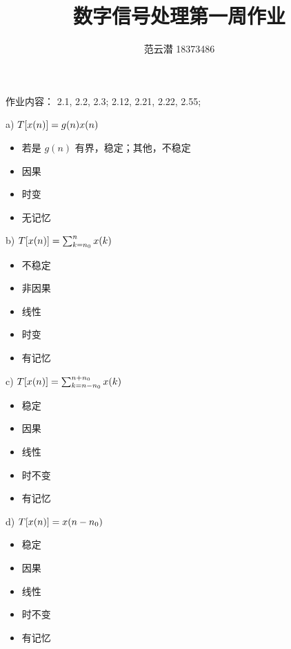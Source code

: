 \documentclass[lang=cn,11pt,a4paper,cite=authoryear]{elegantpaper}
\title{数字信号处理\quad 第一周作业}
\author{范云潜 18373486}
\institute{微电子学院 184111 班}
\date{\zhtoday}
\begin{document}
\maketitle

作业内容： 2.1, 2.2, 2.3; 2.12, 2.21, 2.22, 2.55;

\setlength{\columnseprule}{0.4pt}
\begin{multicols*}{2}



    a) \({T}[x(n)] = g(n) x(n)\) 

    \begin{itemize}
        \item 若是 \(g(n)\) 有界，稳定；其他，不稳定
        \item 因果
        \item 时变
        \item 无记忆
    \end{itemize}

    b) \({T}[x(n)] = \sum_{k=n_0}^n x(k)\) 

    \begin{itemize}
        \item 不稳定
        \item 非因果
        \item 线性
        \item 时变
        \item 有记忆
    \end{itemize}

    c) \({T}[x(n)] = \sum_{k=n-n_0}^{n+n_0} x(k)\) 

    \begin{itemize}
        \item 稳定
        \item 因果
        \item 线性
        \item 时不变
        \item 有记忆
    \end{itemize}

    d) \({T}[x(n)] = x(n-n_0)\)

    \begin{itemize}
        \item 稳定
        \item 因果
        \item 线性
        \item 时不变
        \item 有记忆
    \end{itemize}


\end{multicols*}
\end{document}
